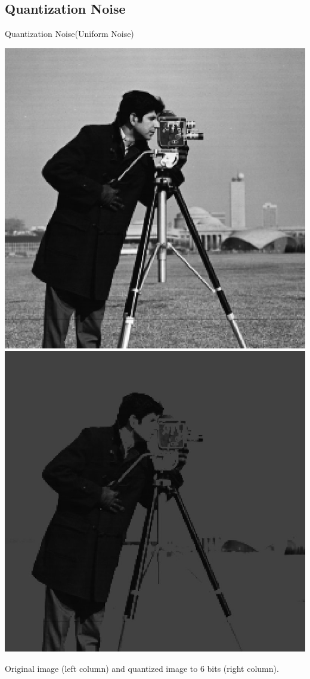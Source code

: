 \documentclass{beamer}
\begin{document}
\subsection{Quantization Noise}
\begin{frame}{Quantization Noise(Uniform Noise)}

\vspace{1cm}
\begin{center}
	  \includegraphics[width=0.4\columnwidth]{images/salt_pepper_origin.jpg}
	    \includegraphics[width=0.4\columnwidth]{images/quantization_noise.jpg}
		
		Original image (left column) and quantized image to 6 bits (right column).
	


\end{center}
\end{frame}
\end{document}
